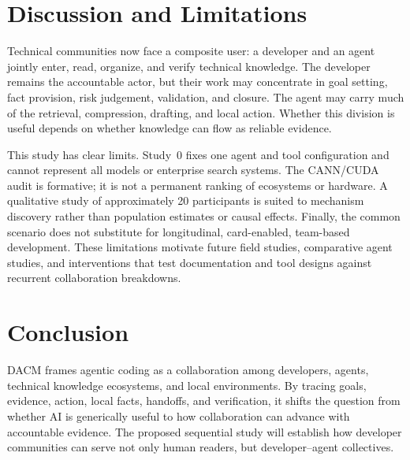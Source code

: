 \documentclass[manuscript,review,anonymous]{acmart}
\begin{document}
\section{Discussion and Limitations}

Technical communities now face a composite user: a developer and an agent jointly enter, read, organize, and verify technical knowledge. The developer remains the accountable actor, but their work may concentrate in goal setting, fact provision, risk judgement, validation, and closure. The agent may carry much of the retrieval, compression, drafting, and local action. Whether this division is useful depends on whether knowledge can flow as reliable evidence.

This study has clear limits. Study~0 fixes one agent and tool configuration and cannot represent all models or enterprise search systems. The CANN/CUDA audit is formative; it is not a permanent ranking of ecosystems or hardware. A qualitative study of approximately 20 participants is suited to mechanism discovery rather than population estimates or causal effects. Finally, the common scenario does not substitute for longitudinal, card-enabled, team-based development. These limitations motivate future field studies, comparative agent studies, and interventions that test documentation and tool designs against recurrent collaboration breakdowns.

\section{Conclusion}

DACM frames agentic coding as a collaboration among developers, agents, technical knowledge ecosystems, and local environments. By tracing goals, evidence, action, local facts, handoffs, and verification, it shifts the question from whether AI is generically useful to how collaboration can advance with accountable evidence. The proposed sequential study will establish how developer communities can serve not only human readers, but developer--agent collectives.



\end{document}
